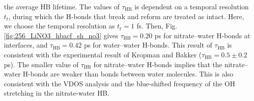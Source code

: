 the average HB lifetime. \cite{SC02} 
The values of $\tau_{\text{HB}}$ is dependent on a temporal resolution $t_t$, during which the H-bonds that break and reform are treated as intact. \cite{AL00} 
%
Here, we choose the temporal resolution as $t_t=1$ fs. 
Then, Fig.\thinspace\ref {fig:256_LiNO3_hbacf_sh_no3} gives $\tau_\text{HB}=0.20$ ps for nitrate--water H-bonds at interfaces, and $\tau_\text{HB}=0.42$ ps for water--water H-bonds.
This result of $\tau_\text{HB}$ is consistent with the experimental result of Kropman and Bakker ($\tau_\text{HB}=0.5\pm0.2$ ps). \cite{MFK01}
The smaller value of $\tau_\text{HB}$ for nitrate--water H-bonds implies that the nitrate--water H-bonds are weaker than bonds between water molecules. 
This is also consistent with the VDOS analysis and the blue-shifted frequency of the OH stretching in the nitrate-water HB. 

